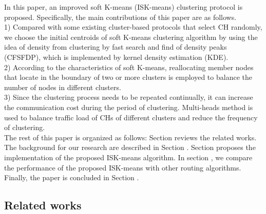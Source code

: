 \documentclass[11pt]{report}
\begin{document}
	
    
    \noindent In this paper, an improved soft K-means (ISK-means) clustering protocol is proposed. Specifically, the main contributions of this paper are as follows.\\ 
    1) Compared with some existing cluster-based protocols that select CH randomly, we choose the initial centroids of soft K-means clustering algorithm \cite{report} by using the idea of density from clustering by fast search and find of density peaks (CFSFDP), which is implemented by kernel density estimation (KDE). \\
    2) According to the characteristics of soft K-means, reallocating member nodes that locate in the boundary of two or more clusters is employed to balance the number of nodes in different clusters. \\
    3) Since the clustering process needs to be repeated continually, it can increase the communication cost during the period of clustering. Multi-heads method is used to balance traffic load of CHs of different clusters and reduce the frequency of clustering.\\
    
    \noindent The rest of this paper is organized as follows: Section \uppercase\expandafter{} reviews the related works. The background for our research are described in Section \uppercase\expandafter{}. Section \uppercase\expandafter{} proposes the implementation of the proposed ISK-means algorithm. In section \uppercase\expandafter{}, we compare the performance of the proposed ISK-means with other routing algorithms. Finally, the paper is concluded in Section \uppercase\expandafter{}.
    
    \subsection{Related works}
    
\end{document}
